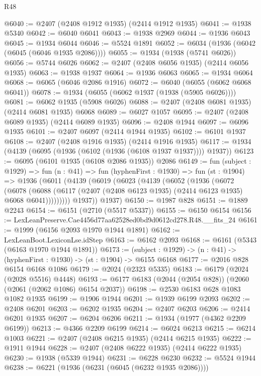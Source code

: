 \begin{lexlean}{R48}
\begin{coremodule}
@6040 := @2407 (@2408 @1912 @1935) (@2414 @1912 @1935)
@6041 := @1938 @5340
@6042 := @6040 @6041
@6043 := @1938 @2969
@6044 := @1936 @6043
@6045 := @1934 @6044
@6046 := @5524 @1891
@6052 := @6034 (@1936 (@6042 (@6045 (@6046 @1935 @2086))))
@6055 := @1934 (@1938 (@5741 @6026))
@6056 := @5744 @6026
@6062 := @2407 (@2408 @6056 @1935) (@2414 @6056 @1935)
@6063 := @1938 @1937
@6064 := @1936 @6063
@6065 := @1934 @6064
@6068 := @6065 (@6046 @2086 @1916)
@6072 := @6040 (@6055 (@6062 @6068 @6041))
@6078 := @1934 (@6055 (@6062 @1937 (@1938 (@5905 @6026))))
@6081 := @6062 @1935 (@5908 @6026)
@6088 := @2407 (@2408 @6081 @1935) (@2414 @6081 @1935) @6068
@6089 := @6027 @1057
@6095 := @2407 (@2408 @6089 @1935) (@2414 @6089 @1935)
@6096 := @2408 @1944
@6097 := @6096 @1935
@6101 := @2407 @6097 (@2414 @1944 @1935)
@6102 := @6101 @1937
@6108 := @2407 (@2408 @1916 @1935) (@2414 @1916 @1935)
@6117 := @1934 (@4139 (@6095 (@1936 (@6102 (@1936 (@6108 @1937 @1937)))) @1937))
@6123 := @6095 (@6101 @1935 (@6108 @2086 @1935)) @2086
@6149 := fun (subject : @1929) =>
  fun (n : @41) =>
  fun (hyphenFirst : @1930) =>
  fun (st : @1904) =>
  @1936
    (@6011
      (@4139
        (@6019
          (@6023
            (@4139
              (@6052
                (@1936
                  (@6072
                    (@6078
                      (@6088
                        (@6117 (@2407 (@2408 @6123 @1935) (@2414 @6123 @1935) @6068 @6041)))))))))
          @1937))
      @1937)
@6150 := @1987 @828
@6151 := @1889 @2243
@6154 := @6151 (@2710 (@5517 @5337))
@6155 := @6150 @6154
@6156 := LexLeanPreserve.Cae4456d77aa62528ed0bd9d0612cd278.R48.__fits_24
@6161 := @1999 (@6156 @2093 @1970 @1944 @1891)
@6162 := LexLeanBoot.LexiconLse.idStep
@6163 := @6162 @2093
@6168 := @6161 (@5343 (@6163 @1970 @1944 @1891))
@6173 := (subject : @1929) -> (n : @41) -> (hyphenFirst : @1930) -> (st : @1904) -> @6155 @6168
@6177 := @2016 @828 @6154 @6168 @1086
@6179 := @2024 (@2323 @5335)
@6183 := @6179 (@2024 (@2028 @5516) @4448)
@6193 := @6177 @6183 (@2044 (@2054 @828)) (@2060 (@2061 (@2062 @1086) @6154 @2037))
@6198 := @2530 @6183 @628 @1083 @1082 @1935
@6199 := @1906 @1944
@6201 := @1939 @6199 @2093
@6202 := @2408 @6201
@6203 := @6202 @1935
@6204 := @2407 @6203
@6206 := @2414 @6201 @1935
@6207 := @6204 @6206
@6211 := @1934 (@1977 (@4362 @2209 @6199))
@6213 := @4366 @2209 @6199
@6214 := @6024 @6213
@6215 := @6214 @1003
@6221 := @2407 (@2408 @6215 @1935) (@2414 @6215 @1935)
@6222 := @1911 @1944
@6228 := @2407 (@2408 @6222 @1935) (@2414 @6222 @1935)
@6230 := @1938 (@5339 @1944)
@6231 := @6228 @6230
@6232 := @5524 @1944
@6238 := @6221 (@1936 (@6231 (@6045 (@6232 @1935 @2086))))

\end{coremodule}
\end{lexlean}
